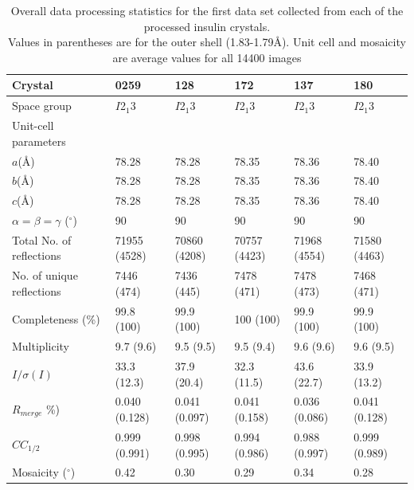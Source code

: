 \begin{table}[ht!]
\centering
\captionsetup{justification=centering}
	\caption[Data processing statistics for the first data set collected from each of the processed insulin crystals.]{Overall data processing statistics for the first data set collected from each of the processed insulin crystals.
	\\[1pt]
	Values in parentheses are for the outer shell (1.83-1.79\AA). Unit cell and mosaicity are average values for all 14400 images}
	\centering
	\begin{tabular}{p{3.5cm} p{2cm} p{2cm} p{2cm} p{2cm} p{2cm}}
		\hline
		Crystal  																	&0259				   &128						&172					 &137						&180						\\
		\hline
		Space group   														&$I$2$_{\text{1}}$3	 &$I$2$_{\text{1}}$3		&$I$2$_{\text{1}}$3	   &$I$2$_{\text{1}}$3			&$I$2$_{\text{1}}$3 		\\
		Unit-cell parameters  										& 						 &    					&   					 &   						&  						 	\\
		$a$(\AA)  																&78.28				 &78.28					&78.35				 &78.36 				&78.40					\\
		$b$(\AA)  																&78.28				 &78.28					&78.35				 &78.36					&78.40					\\
		$c$(\AA)  																&78.28				 &78.28					&78.35				 &78.36				  &78.40					\\
		$\alpha = \beta = \gamma$ ($^{\circ}$) 		&90					   &90 						&90						 &90					 	&90							\\
		Total No. of reflections									&71955 (4528)  &70860 (4208)	&70757 (4423)	 &71968 (4554)	&71580 (4463)		\\
		No. of unique reflections									&7446 (474)	   &7436 (445)		&7478 (471)		 &7478 (473)		&7468 (471)			\\
		Completeness (\%) 											&99.8 (100)	   &99.9 (100)		&100 (100)		 &99.9 (100)		&99.9 (100) 		\\
		Multiplicity															&9.7 (9.6)		 &9.5 (9.5)			&9.5 (9.4)		 &9.6 (9.6)		  &9.6 (9.5)			\\
		$I/\sigma (I)$												 		&33.3 (12.3)	 &37.9 (20.4)		&32.3	 (11.5)	 &43.6 (22.7)	  &33.9 (13.2)  	\\
		$R_{merge}$ \%)													&0.040 (0.128) &0.041 (0.097) &0.041 (0.158) &0.036 (0.086) &0.041 (0.128)  \\
		$CC_{1/2}$																&0.999 (0.991) &0.998 (0.995) &0.994 (0.986) &0.988 (0.997) &0.999 (0.989)	\\
		Mosaicity ($^{\circ}$)										&0.42				   &0.30					&0.29					 &0.34					&0.28						\\
		\hline
	\end{tabular}
	\label{tab: Hamburg data processing}
\end{table}

